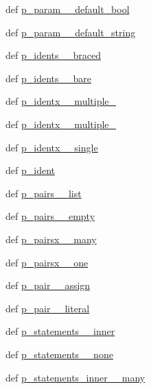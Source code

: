 \begin{DoxyCompactItemize}
def \hyperlink{classslicc_1_1parser_1_1SLICC_ab1301e8e7dbdfb7e2b5815e6173d02da}{p\_\-param\_\-\_\-default\_\-bool}
\item 
def \hyperlink{classslicc_1_1parser_1_1SLICC_aab237e59f5c5672509e5c0bb560bbaa2}{p\_\-param\_\-\_\-default\_\-string}
\item 
def \hyperlink{classslicc_1_1parser_1_1SLICC_ad02a597e711c93ec857187e3ca25b187}{p\_\-idents\_\-\_\-braced}
\item 
def \hyperlink{classslicc_1_1parser_1_1SLICC_a5ef77afd28d0d329c16998601cccb68f}{p\_\-idents\_\-\_\-bare}
\item 
def \hyperlink{classslicc_1_1parser_1_1SLICC_a6344d2871d9bb2fde5d940b92dbb8fd6}{p\_\-identx\_\-\_\-multiple\_}
\item 
def \hyperlink{classslicc_1_1parser_1_1SLICC_af5bf282b073c0295d74b7244ae21d607}{p\_\-identx\_\-\_\-multiple\_}
\item 
def \hyperlink{classslicc_1_1parser_1_1SLICC_a6ab9c67e60b1329015b55e7b13a58bf2}{p\_\-identx\_\-\_\-single}
\item 
def \hyperlink{classslicc_1_1parser_1_1SLICC_ac6953139e7912e8b74f9cc2ebe2befd7}{p\_\-ident}
\item 
def \hyperlink{classslicc_1_1parser_1_1SLICC_a3fd3d9fd8b7476e2bc528c2844abf9d6}{p\_\-pairs\_\-\_\-list}
\item 
def \hyperlink{classslicc_1_1parser_1_1SLICC_aec4bd1f627bdee6f671f29365c3391bc}{p\_\-pairs\_\-\_\-empty}
\item 
def \hyperlink{classslicc_1_1parser_1_1SLICC_a9ae62ba90c608a64c39c7f20bf4d550f}{p\_\-pairsx\_\-\_\-many}
\item 
def \hyperlink{classslicc_1_1parser_1_1SLICC_aaf9410b6d0eedbb8812ebb8ac3609cdf}{p\_\-pairsx\_\-\_\-one}
\item 
def \hyperlink{classslicc_1_1parser_1_1SLICC_a5e41d69732541552bf82fcaaa668ac0b}{p\_\-pair\_\-\_\-assign}
\item 
def \hyperlink{classslicc_1_1parser_1_1SLICC_a885647ed0a56c566300f99748db04d44}{p\_\-pair\_\-\_\-literal}
\item 
def \hyperlink{classslicc_1_1parser_1_1SLICC_a1986800af6f320a790dfee643705ed65}{p\_\-statements\_\-\_\-inner}
\item 
def \hyperlink{classslicc_1_1parser_1_1SLICC_a13b5a28aefa2d0a6cffd77e2a0372f26}{p\_\-statements\_\-\_\-none}
\item 
def \hyperlink{classslicc_1_1parser_1_1SLICC_a3f2507fb0d5c325fe894124d2c338ec1}{p\_\-statements\_\-inner\_\-\_\-many}
\item 

\end{DoxyCompactItemize}
